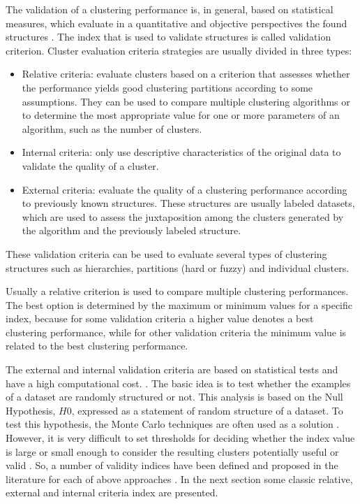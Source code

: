 The validation of a clustering performance is, in general, based on statistical measures, which evaluate in a quantitative and objective perspectives the found structures \cite{jain1988algorithms}. The index that is used to validate structures is called validation criterion. Cluster evaluation criteria strategies are usually divided in three types:
\begin{itemize}
\item Relative criteria: evaluate clusters based on a criterion that assesses whether the performance yields good clustering partitions according to some assumptions. They can be used to compare multiple clustering algorithms or to determine the most appropriate value for one or more parameters of an algorithm, such as the number of clusters.

\item Internal criteria: only use descriptive characteristics of the original data to validate the quality of a cluster.

\item External criteria: evaluate the quality of a clustering performance according to previously known structures. These structures are usually labeled datasets, which are used to assess the juxtaposition among the clusters generated by the algorithm and the previously labeled structure.
\end{itemize}

These validation criteria can be used to evaluate several types of clustering structures such as hierarchies, partitions (hard or fuzzy) and individual clusters.

Usually a relative criterion is used to compare multiple clustering performances. The best option is determined by the maximum or minimum values for a specific index, because for some validation criteria a higher value denotes a best clustering performance, while for other validation criteria the minimum value is related to the best clustering performance.

The external and internal validation criteria are based on statistical tests and have a high computational cost. \cite{halkidi2001clustering}. The basic idea is to test whether the examples of a dataset are randomly structured or not. This analysis is based on the Null Hypothesis, $H0$, expressed as a statement of random structure of a dataset. To test this hypothesis, the Monte Carlo techniques are often used as a solution \cite{Theodoridis2009}. However, it is very difficult to set thresholds for deciding whether the index value is large or small enough to consider the resulting clusters potentially useful or valid \cite{carvalho2011inteligencia}. So, a number of validity indices have been defined and proposed in the literature for each of above approaches \cite{jain1988algorithms,halkidi2002cluster,halkidi2002clustering,Theodoridis2009}. In the next section some classic relative, external and internal criteria index are presented.


